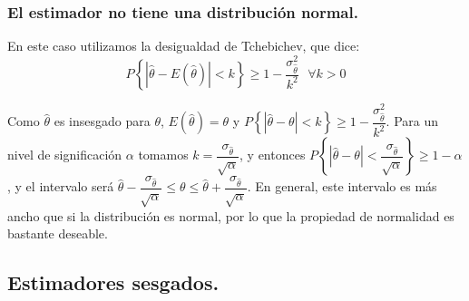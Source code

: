 \subsubsection{El estimador no tiene una distribuci\'on normal.}

En este caso utilizamos la desigualdad de Tchebichev, que dice: 
\[
P\left\{ \left|\hat{\theta}-E\left(\hat{\theta}\right)\right|<k\right\} \geq1-\dfrac{\sigma_{\hat{\theta}}^{2}}{k^{2}}\,\,\,\,\forall k>0
\]


Como $\hat{\theta}$ es insesgado para $\theta$, $E\left(\hat{\theta}\right)=\theta$
y $P\left\{ \left|\hat{\theta}-\theta\right|<k\right\} \geq1-\dfrac{\sigma_{\hat{\theta}}^{2}}{k^{2}}$.
Para un nivel de significaci\'on $\alpha$ tomamos $k=\dfrac{\sigma_{\hat{\theta}}}{\sqrt{\alpha}}$,
y entonces $P\left\{ \left|\hat{\theta}-\theta\right|<\dfrac{\sigma_{\hat{\theta}}}{\sqrt{\alpha}}\right\} \geq1-\alpha$,
y el intervalo ser\'a $\hat{\theta}-\dfrac{\sigma_{\hat{\theta}}}{\sqrt{\alpha}}\leq\theta\leq\hat{\theta}+\dfrac{\sigma_{\hat{\theta}}}{\sqrt{\alpha}}$.
En general, este intervalo es m\'as ancho que si la distribuci\'on es
normal, por lo que la propiedad de normalidad es bastante deseable.


\subsection{Estimadores sesgados.}

